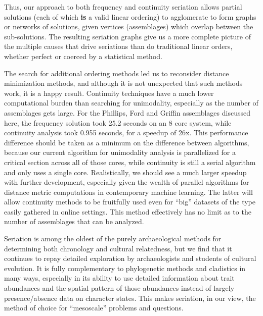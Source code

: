 \documentclass[graybox,natbib]{svmult}
\begin{document}
Thus, our approach to both frequency and continuity seriation allows
partial solutions (each of which \textbf{is} a valid linear ordering) to
agglomerate to form graphs or networks of solutions, given vertices
(assemblages) which overlap between the sub-solutions. The resulting
seriation graphs give us a more complete picture of the multiple causes
that drive seriations than do traditional linear orders, whether perfect
or coerced by a statistical method.

The search for additional ordering methods led us to reconsider distance
minimization methods, and although it is not unexpected that such
methods work, it is a happy result. Continuity techniques have a much
lower computational burden than searching for unimodality, especially as
the number of assemblages gets large. For the Phillips, Ford and Griffin
assemblages discussed here, the frequency solution took 25.2 seconds on
an 8 core system, while continuity analysis took 0.955 seconds, for a
speedup of 26x. This performance difference should be taken as a minimum
on the difference between algorithms, because our current algorithm for
unimodality analysis is parallelized for a critical section across all
of those cores, while continuity is still a serial algorithm and only
uses a single core. Realistically, we should see a much larger speedup
with further development, especially given the wealth of parallel
algorithms for distance metric computations in contemporary machine
learning. The latter will allow continuity methods to be fruitfully used
even for ``big'' datasets of the type easily gathered in online
settings. This method effectively has no limit as to the number of
assemblages that can be analyzed.

Seriation is among the oldest of the purely archaeological methods for
determining both chronology and cultural relatedness, but we find that
it continues to repay detailed exploration by archaeologists and
students of cultural evolution. It is fully complementary to
phylogenetic methods and cladistics in many ways, especially in its
ability to use detailed information about trait abundances and the
spatial pattern of those abundances instead of largely presence/absence
data on character states. This makes seriation, in our view, the method
of choice for ``mesoscale'' problems and questions.





\end{document}
